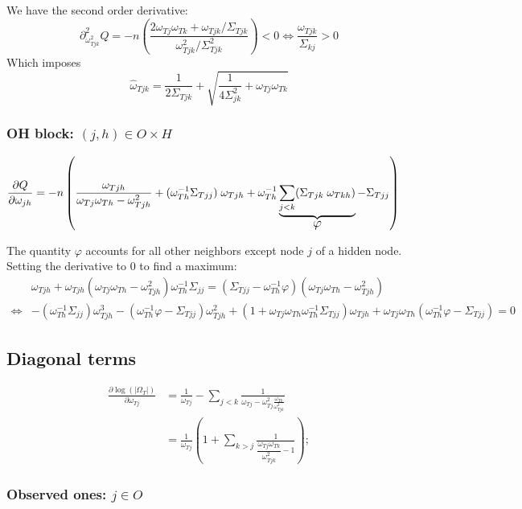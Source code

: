 \documentclass[11pt,a4paper]{article}
\begin{document}
We have the second order derivative:
$$\partial^2_{\omega_{Tjk}^2}Q = -n\left(\frac{2\omega_{Tj}\omega_{Tk} + \omega_{Tjk}/\Sigma_{Tjk}}{\omega_{Tjk}^2/\Sigma_{Tjk}^2}\right) <0 \iff \frac{\omega_{Tjk}}{\Sigma_{kj}}>0$$
Which imposes $$\hat{\omega}_{Tjk} = \frac{1}{2\Sigma_{Tjk}}+ \sqrt{\frac{1}{4\Sigma_{jk}^2} + \omega_{Tj}\omega_{Tk}}$$


\subsubsection{OH block: $(j,h)\in O\times H$}

\begin{align*}
\frac{\partial Q}{\partial \omega_{jh}}  &= -n\left( \frac{\omega_{Tjh}}{\omega_{Tj}\omega_{Th}-\omega_{Tjh}^2}+(\omega_{Th}^{-1}\Sigma_{Tjj})\;\omega_{Tjh} + \omega_{Th}^{-1}\underbrace{\sum_{j<k}(\Sigma_{Tjk}\;\omega_{Tkh})}_{\text{\large{$\varphi$}}}-\Sigma_{Tjj}\right)
\end{align*}

The quantity $\varphi$ accounts for all other neighbors except node $j$ of a hidden node. 
Setting the derivative to 0 to find a maximum:
\begin{align*}
&\omega_{Tjh} + \omega_{Tjh}(\omega_{Tj}\omega_{Th} - \omega_{Tjh}^2)\omega_{Th}^{-1}\Sigma_{jj} = (\Sigma_{Tjj} - \omega_{Th}^{-1} \varphi)(\omega_{Tj}\omega_{Th} - \omega_{Tjh}^2)\\
\iff & -(\omega_{Th}^{-1} \Sigma_{jj})\omega_{Tjh}^3 - (\omega_{Th}^{-1}\varphi - \Sigma_{Tjj})\omega_{Tjh}^2 + (1+\omega_{Tj}\omega_{Th}\omega_{Th  }^{-1}\Sigma_{Tjj})\omega_{Tjh} + \omega_{Tj}\omega_{Th}(\omega_{Th}^{-1}\varphi - \Sigma_{Tjj}) = 0
\end{align*}
\subsection{Diagonal terms}
\begin{align*}
\frac{\partial \log(|\Omega_T|)}{\partial \omega_{Tj}} &= \frac{1}{\omega_{Tj}} - \sum_{j<k} \frac{1}{\omega_{Tj} - \omega_{Tj}^2 \frac{\omega_{Tk}}{\omega_{Tjk}^2}}\\
&= \frac{1}{\omega_{Tj}}\left( 1 + \sum_{k>j} \frac{1}{\dfrac{\omega_{Tj}\omega_{Tk}}{\omega_{Tjk} ^2} - 1}  \right);
\end{align*}

\subsubsection{Observed ones: $j\in O $}
\end{document}
